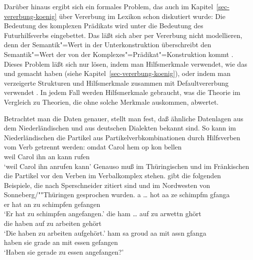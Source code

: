 Darüber hinaus ergibt sich ein formales Problem, das auch im Kapitel~\ref{sec-vererbung-koenig} 
über Vererbung im Lexikon schon diskutiert wurde: Die Bedeutung des komplexen Prädikats wird unter
die Bedeutung des Futurhilfsverbs eingebettet. Das läßt sich aber per Vererbung nicht modellieren,
denn der Semantik"=Wert in der Unterkonstruktion überschreibt den Semantik"=Wert der von der
Komplexes"=Prädikat"=Konstruktion kommt \citep[Abschnitt~4.2]{MuellerPersian}. Dieses Problem läßt sich nur lösen, indem man Hilfsmerkmale
verwendet, wie das \citet[]{Kathol94a} und \citet{Koenig99a} gemacht haben (siehe Kapitel~\ref{sec-vererbung-koenig}),
oder indem man verzeigerte Strukturen und Hilfsmerkmale zusammen mit Defaultvererbung verwendet 
\citep{MuellerDefaults}. In jedem Fall werden Hilfsmerkmale gebraucht, was die Theorie im Vergleich
zu Theorien, die ohne solche Merkmale auskommen, abwertet.

Betrachtet man die Daten genauer, stellt man fest, daß ähnliche Datenlagen aus dem Niederländischen
und aus deutschen Dialekten bekannt sind. So kann im Niederländischen
die Partikel aus Partikelverbkombinationen
durch Hilfsverben vom Verb getrennt werden:
\ea
\gll omdat Carol hem op kon  bellen\footnotemark\\
     weil  Carol ihn an kann rufen\\
\glt `weil Carol ihn anrufen kann'
\z
Genauso muß im Thüringischen und im Fränkischen die Partikel vor den
Verben im Verbalkomplex stehen. \citet*[]{Werner94a} gibt die folgenden Beispiele,
die nach Sperschneider zitiert sind
und im Nordwesten von Sonneberg/""Thüringen gesprochen wurden.
\eal
\label{ex-sonneberg-partikel-phasen}
\ex{}
\gll a  \ldots{} hot aa   ze schimpfm  gfanga\\
     er {}       hat an   zu schimpfen gefangen\\
\glt `Er hat zu schimpfen angefangen.'
\ex{}
\gll die  ham  \ldots{}  auf  zu arwettn ghört\\
     die haben {}        auf  zu arbeiten gehört\\
\glt `Die haben zu arbeiten aufgehört.'
\ex
\gll ham   sa  groud  aa mit assn  gfanga\\
     haben sie grade  an mit essen gefangen\\
\glt `Haben sie gerade zu essen angefangen?'
\zl

